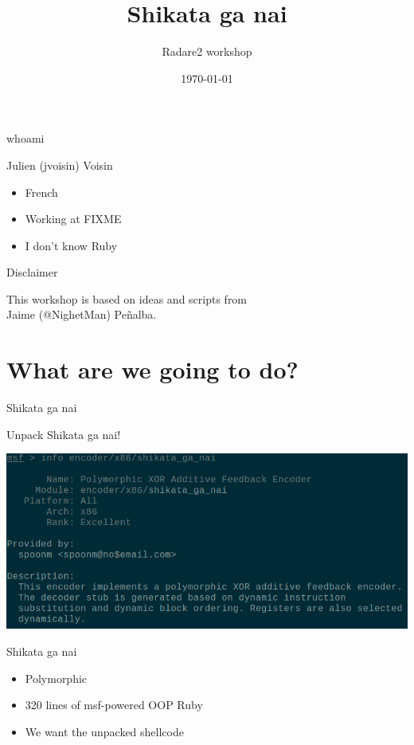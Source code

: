 \documentclass{beamer}
\title{Shikata ga nai}
\author{Radare2 workshop}
\date{\today}
\institute{hack.lu 2015}
\begin{document}
\maketitle

\begin{frame}{whoami}
	\begin{block}{Julien (jvoisin) Voisin}
	\begin{itemize}
		\item French
		\item Working at FIXME
		\item I don't know Ruby
	\end{itemize}
	\end{block}
\end{frame}

\begin{frame}{Disclaimer}
	\begin{center}
		This workshop is based on ideas and scripts from\\
		Jaime (\alert{@NighetMan}) Peñalba.
	\end{center}
\end{frame}

\section{What are we going to do?}

\begin{frame}{Shikata ga nai}
	\begin{center}
		Unpack \alert{Shikata ga nai}!
	\end{center}
	\includegraphics[width=\textwidth]{description.png}
\end{frame}

\begin{frame}{Shikata ga nai}
	\begin{itemize}
		\item Polymorphic
		\item 320 lines of msf-powered OOP Ruby
		\item We want the unpacked shellcode
	\end{itemize}
\end{frame}
\end{document}
